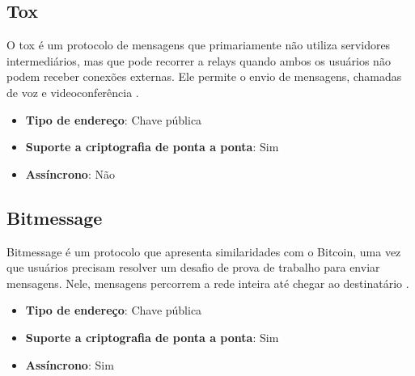 \subsection{Tox}

O tox é um protocolo de mensagens que primariamente não utiliza servidores intermediários, mas que pode recorrer a relays quando ambos os usuários não podem receber conexões externas. Ele permite o envio de mensagens, chamadas de voz e videoconferência \cite{toxcore}.

\begin{itemize}
  \item \textbf{Tipo de endereço}: Chave pública
  \item \textbf{Suporte a criptografia de ponta a ponta}: Sim
  \item \textbf{Assíncrono}: Não
\end{itemize}

\subsection{Bitmessage}

Bitmessage é um protocolo que apresenta similaridades com o Bitcoin, uma vez que usuários precisam resolver um desafio de prova de trabalho para enviar mensagens. Nele, mensagens percorrem a rede inteira até chegar ao destinatário \cite{bitmessage}.

\begin{itemize}
  \item \textbf{Tipo de endereço}: Chave pública
  \item \textbf{Suporte a criptografia de ponta a ponta}: Sim
  \item \textbf{Assíncrono}: Sim
\end{itemize}

